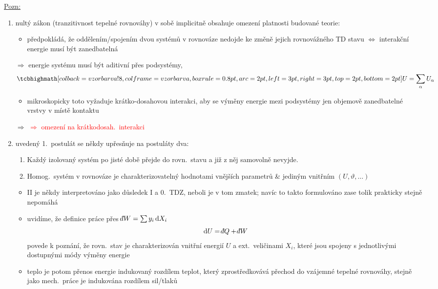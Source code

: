 \underline{Pozn:}
\begin{enumerate}[label=\arabic*)]
  \item nultý zákon (tranzitivnost tepelné rovnováhy) v sobě implicitně obsahuje omezení platnosti budované teorie:
  \begin{itemize}[label=$\to$]
    \item předpokládá, že oddělením/spojením dvou systémů v rovnováze nedojde ke změně jejich rovnovážného TD stavu $\Leftrightarrow$ interakční energie musí být zanedbatelná
  \end{itemize}
  $\Rightarrow$ energie systému musí být aditivní přes podsystémy,
  \[ \vzorec{U = \sum_\alpha U_\alpha} \]
  \begin{itemize}
    \item mikroskopicky toto vyžaduje krátko-dosahovou interakci, aby se výměny energie mezi podsystémy  jen objemově zanedbatelné vrstvy v místě kontaktu
  \end{itemize}
  $\Rightarrow$ 
  \hfill \textcolor{Red}{ $\Rightarrow$ omezení na krátkodosah.\ interakci}

  \item uvedený 1.\ postulát se někdy upřesňuje na postuláty dva:
  \begin{enumerate}[label=\Roman*)]
    \item Každý izolovaný systém po jisté době přejde do rovn.\ stavu a již z něj samovolně nevyjde.
    \item Homog.\ systém v rovnováze je charakterizovatelný hodnotami vnějších parametrů \& jediným vnitřním $(U,\vartheta,\dots)$
  \end{enumerate}
  \begin{itemize}
    \item II je někdy interpretováno jako důsledek I a 0.\ TDZ, neboli je v tom zmatek; navíc to takto formulováno zase tolik prakticky stejně nepomáhá
    \item uvidíme, že definice práce přes $\dbar W = \sum y_i\,\dd X_i$
          \[ \dd U = \dbar Q + \dbar W \]
          povede k poznání, že rovn.\ stav je charakterizován vnitřní energií $U$ a ext.\ veličinami $X_i$, které jsou spojeny s jednotlivými dostupnými módy výměny energie
    \item teplo je potom přenos energie indukovaný rozdílem teplot, který zprostředkovává přechod do vzájemné tepelné rovnováhy, stejně jako mech.\ práce je indukována rozdílem sil/tlaků
  \end{itemize}
\end{enumerate}

